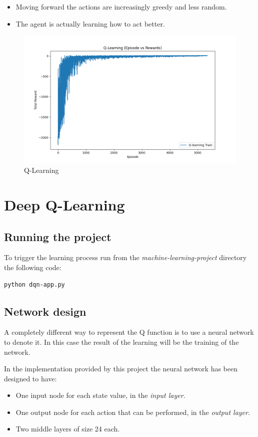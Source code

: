 \documentclass{article}
\begin{document}
\begin{itemize}
  \item Moving forward the actions are increasingly greedy and less random.
  \item The agent is actually learning how to act better.
\end{itemize}

\begin{figure}
  \includegraphics[width=\linewidth]{qlearning.png}
  \caption{Q-Learning}
  \label{fig:qlearning}
\end{figure}

\section{Deep Q-Learning}

\subsection{Running the project}

To trigger the learning process run from the \emph{machine-learning-project} directory the following code:

\begin{verbatim}
python dqn-app.py
\end{verbatim}

\subsection{Network design}

A completely different way to represent the Q function is to use a neural network to denote it.
In this case the result of the learning will be the training of the network.

In the implementation provided by this project the neural network has been designed to have:
\begin{itemize}
  \item One input node for each state value, in the \emph{input layer}.
  \item One output node for each action that can be performed, in the \emph{output layer}.
  \item Two middle layers of size 24 each.
\end{itemize}
\end{document}

